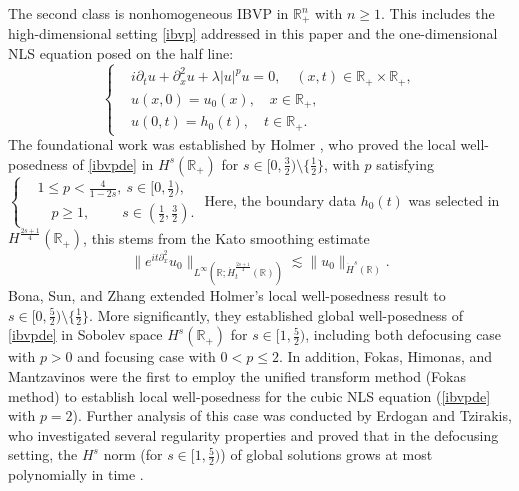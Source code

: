 \documentclass[preprint,compress,12pt]{elsarticle}
\numberwithin{equation}{section}
\begin{document}
	The second class is nonhomogeneous IBVP in  $\mathbb{R}^{n}_{+}$ with $n\geq1$. This includes the high-dimensional setting \eqref{ibvp} addressed in this paper and the one-dimensional NLS equation posed on the half line:
	\begin{equation}\label{ibvpde}
		\left\{\begin{aligned}
			&	i\partial_{t}u+\partial_{x}^{2}u+\lambda |u|^pu=0, \quad (x, t) \in \mathbb{R}_{+} \times \mathbb{R}_{+}, \\
			&u(x,0)=u_0(x),\quad x\in\mathbb{R}_{+},\\& u(0,t)=h_{0}(t),\quad t\in\mathbb{R}_{+}.
		\end{aligned}
		\right.		
	\end{equation}
	  The foundational work was established by Holmer \cite{chatter}, who proved the local well-posedness of \eqref{ibvpde} in $H^{s}(\mathbb{R}_{+})$ for $s\in[0,\frac{3}{2})\setminus\{\frac{1}{2}\}$, with $p$ satisfying \(\left\{\begin{aligned}
	  	&1 \leq p < \tfrac{4}{1-2s},\ s \in [0, \tfrac{1}{2}), \\
	  	&\quad p \geq 1,\quad\quad\; s \in (\tfrac{1}{2}, \tfrac{3}{2}).
	  \end{aligned}\right.\) Here, the boundary data $h_{0}(t)$ was selected in $H^{\frac{2s+1}{4}}(\mathbb{R}_{+})$, this stems  from the Kato smoothing estimate 	\cite{ken}
	\begin{equation}\label{o}
		\|e^{it\partial_{x}^{2}} u_{0}\|_{L^{\infty}(\mathbb{R};\dot{H}_{t}^{\frac{2s+1}{4}}(\mathbb{R}))}\lesssim \|u_{0}\|_{\dot{H}^{s}(\mathbb{R})}.
	\end{equation}	
Bona, Sun, and Zhang \cite{figment} extended Holmer's local well-posedness result \cite{chatter} to  $s\in[0,\frac{5}{2})\setminus\{\frac{1}{2}\}$. More significantly, they established global well-posedness of \eqref{ibvpde} in Sobolev space  $H^{s}(\mathbb{R}_{+})$ for $s\in[1,\frac{5}{2})$, including both defocusing case with $p>0$ and focusing case with $0<p\leq2$. In addition, Fokas, Himonas, and Mantzavinos \cite{dew} were the first to employ the unified transform method (Fokas method) to establish local well-posedness for the cubic NLS equation (\eqref{ibvpde} with $p=2$). Further analysis of this case was conducted by Erdogan and Tzirakis, who investigated several regularity properties and proved that in the defocusing setting, the $H^{s}$ norm (for $s\in [1,\frac{5}{2})$) of global solutions grows at most polynomially in time  \cite{Erdogan}.
\end{document}
